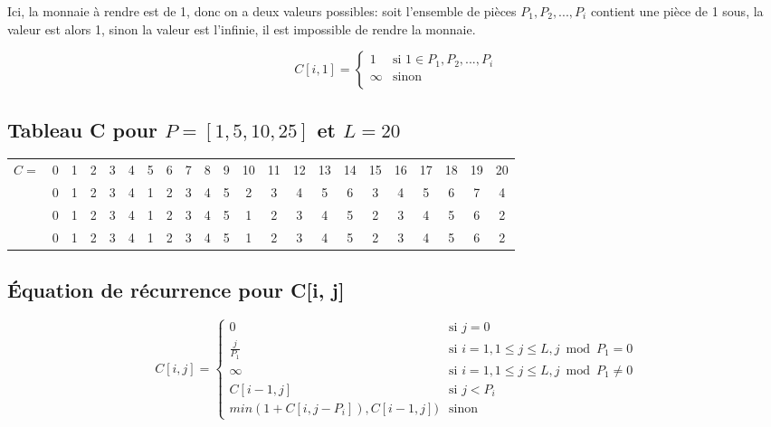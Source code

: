 \documentclass[10.9pt]{article} %
\begin{document}
Ici, la monnaie à rendre est de 1, donc on a deux valeurs possibles: soit l'ensemble de pièces
$P_1, P_2, ... , P_i$ contient une pièce de 1 sous, la valeur est alors 1, sinon la valeur est
l'infinie, il est impossible de rendre la monnaie.

\begin{equation}
C[i,1] = 
\begin{cases}
 1  &\text{si }  1 \in P_1, P_2, ... , P_i \\
 \infty                   &\text{sinon}\\
\end{cases}
\end{equation}

\subsection{Tableau C pour $P = [1, 5, 10, 25]$ et $L = 20$}
\begin{tabular}{c|c|c|c|c|c|c|c|c|c|c|c|c|c|c|c|c|c|c|c|c|c|}
\cline{2-22} 
\multirow{4}{*}{$C=$} & 0 & 1 & 2 & 3 & 4 & 5 & 6 & 7 & 8 & 9 & 10 & 11 & 12 & 13 &14 & 15 & 16 & 17 & 18 & 19 & 20 \\ \cline{2-22}
 & 0 & 1 & 2 & 3 & 4 & 1 & 2 & 3 & 4 & 5 & 2 & 3 & 4 & 5 & 6 & 3 & 4 & 5 & 6 & 7 & 4 \\ \cline{2-22}
 & 0 & 1 & 2 & 3 & 4 & 1 & 2 & 3 & 4 & 5 & 1 & 2 & 3 & 4 & 5 & 2 & 3 & 4 & 5 & 6 & 2 \\ \cline{2-22}
 & 0 & 1 & 2 & 3 & 4 & 1 & 2 & 3 & 4 & 5 & 1 & 2 & 3 & 4 & 5 & 2 & 3 & 4 & 5 & 6 & 2 \\ \cline{2-22}
\end{tabular}

\subsection{Équation de récurrence pour C[i, j]}

\begin{equation}
 C[i, j] = 
 \begin{cases}
  0 			&\text{si } j = 0 \\
  \frac{j}{P_1} 	&\text{si } i = 1, 1 \le j \le L, j \bmod P_1 = 0 \\
  \infty 		&\text{si } i = 1, 1 \le j \le L, j \bmod P_1 \neq 0 \\
  C[i-1, j]		&\text{si } j < P_i \\
  min(1 + C[i, j - P_i]), C[i-1, j])	&\text{sinon}
 \end{cases}
\end{equation}
\end{document}
